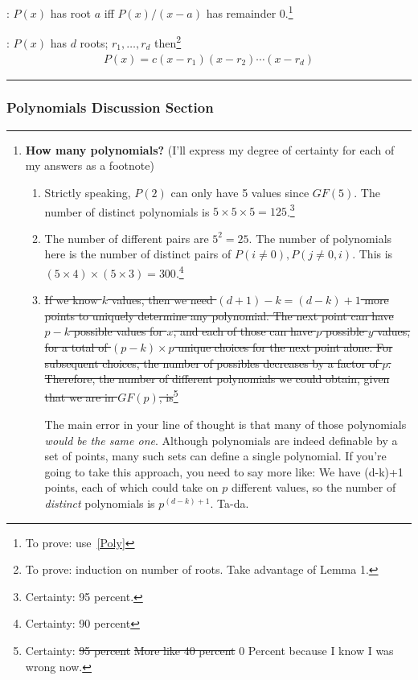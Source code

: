 \documentclass[12pt]{article}
\newcommand{\myspace}{\vspace{2\bigskipamount}}
\begin{document}
: $P(x)$ has root $a$ iff $P(x)/(x-a)$ has remainder 0.\footnote{To prove: use~\ref{Poly}}

: $P(x)$ has $d$ roots; $r_1, \ldots, r_d$ then\footnote{To prove: induction on number of roots. Take advantage of Lemma 1.}
	\begin{align}
		P(x) = c(x-r_1)(x-r_2)\cdots(x-r_d)
	\end{align}


\myspace
{}
\hrule
\subsubsection{Polynomials Discussion Section}
\hrule
\begin{small}
\begin{enumerate}
	\item \textbf{How many polynomials?} (I'll express my degree of certainty for each of my answers as a footnote)
	\begin{enumerate}
		\item Strictly speaking, $P(2)$ can only have 5 values since $GF(5)$. The number of distinct polynomials is $5\times 5\times 5 = 125$.\footnote{Certainty: 95 percent.}
		\item The number of different pairs are $5^2 = 25$. The number of polynomials here is the number of distinct pairs of $P(i\ne0),P(j\ne0,i)$. This is $(5\times4)\times(5\times3)=300$.\footnote{Certainty: 90 percent}
		\item \begin{scriptsize}\sout{If we know $k$ values, then we need $(d+1)-k=(d-k)+1$ more points to uniquely determine any polynomial. The next point can have $p-k$ possible values for $x$, and each of those can have $p$ possible $y$ values, for a total of $(p-k)\times p$ unique choices for the next point alone. For subsequent choices, the number of possibles decreases by a factor of $p$. Therefore, the number of different polynomials we could obtain, given that we are in $GF(p)$, is}\footnote{Certainty:  \sout{95 percent} \sout{More like 40 percent} 0 Percent because I know I was wrong now.}\end{scriptsize} 
		
		 The main error in your line of thought is that many of those polynomials \emph{would be the same one}. Although polynomials are indeed definable by a set of points, many such sets can define a single polynomial. If you're going to take this approach, you need to say more like: We have (d-k)+1 points, each of which could take on $p$ different values, so the number of \textit{distinct} polynomials is $p^{(d-k)+1}$. Ta-da.
		

\end{enumerate}
\end{enumerate}
\end{small}
\end{document}
